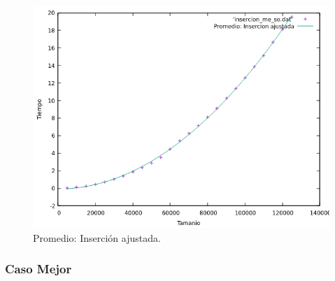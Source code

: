 \documentclass[a4paper,12pt,twoside]{article} %
\begin{document}
\begin{itemize}
\begin{figure}[h]
\begin{center}
  	\includegraphics[scale=0.8]{insercion_me_so_a.png}
  	\caption{Promedio: Inserción ajustada.}
  	
  \end{center}
\end{figure}

	\end{itemize}
\newpage
	
	
	\subsubsection{Caso Mejor}
	
\end{document}
